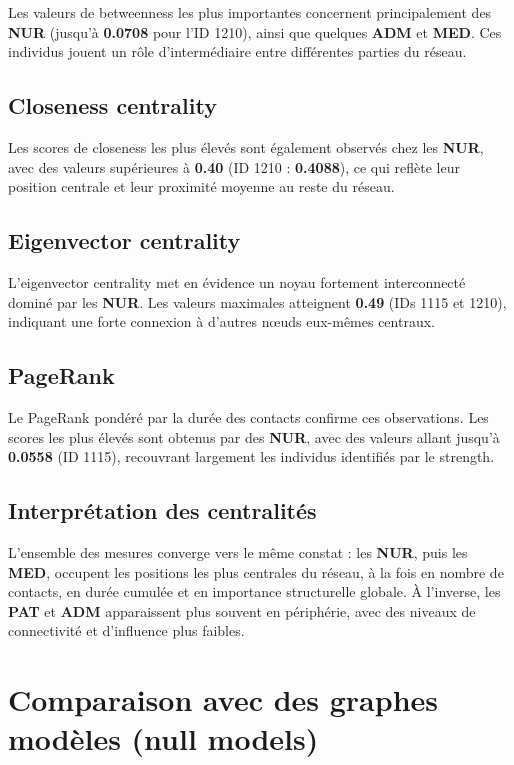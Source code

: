 \documentclass[10pt,twocolumn]{article}
\begin{document}
Les valeurs de betweenness les plus importantes concernent principalement
des \textbf{NUR} (jusqu’à \textbf{0.0708} pour l’ID 1210),
ainsi que quelques \textbf{ADM} et \textbf{MED}.
Ces individus jouent un rôle d’intermédiaire entre différentes parties du réseau.

\subsection{Closeness centrality}

Les scores de closeness les plus élevés sont également observés
chez les \textbf{NUR}, avec des valeurs supérieures à \textbf{0.40}
(ID 1210 : \textbf{0.4088}),
ce qui reflète leur position centrale et leur proximité moyenne
au reste du réseau.

\subsection{Eigenvector centrality}

L’eigenvector centrality met en évidence un noyau fortement interconnecté
dominé par les \textbf{NUR}.
Les valeurs maximales atteignent \textbf{0.49} (IDs 1115 et 1210),
indiquant une forte connexion à d’autres nœuds eux-mêmes centraux.

\subsection{PageRank}

Le PageRank pondéré par la durée des contacts confirme ces observations.
Les scores les plus élevés sont obtenus par des \textbf{NUR},
avec des valeurs allant jusqu’à \textbf{0.0558} (ID 1115),
recouvrant largement les individus identifiés par le strength.

\subsection{Interprétation des centralités}

L’ensemble des mesures converge vers le même constat :
les \textbf{NUR}, puis les \textbf{MED}, occupent les positions les plus centrales
du réseau, à la fois en nombre de contacts, en durée cumulée
et en importance structurelle globale.
À l’inverse, les \textbf{PAT} et \textbf{ADM} apparaissent plus souvent
en périphérie, avec des niveaux de connectivité et d’influence plus faibles.


\section{Comparaison avec des graphes modèles (null models)}
\end{document}
